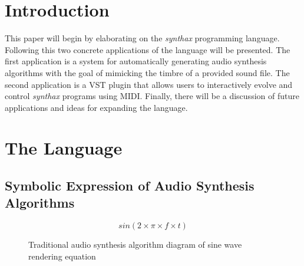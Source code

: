 \documentclass[12pt]{article}
\newcommand{\audiolanguagenamelower}{\emph{synthax}}
\begin{document}
\maketitle

\begin{abstract}
This paper presents an alternative method of digital audio synthesis using Lisp-like symbolic expressions (S-expressions). The method centers around a novel audio programming language called \audiolanguagenamelower{} where valid programs directly represent algorithms for audio synthesis. The motivation for \audiolanguagenamelower's use of S-expressions to generate audio is that they are recursively defined, flexible and convenient from a computational perspective. Additionally, the structures can be created and manipulated through genetic programming allowing users to search for synthesis algorithms that mimic existing instruments or to find entirely new timbres.
\end{abstract}



\section{Introduction}\label{TOPINTRO}
This paper will begin by elaborating on the \audiolanguagenamelower{} programming language. Following this two concrete applications of the language will be presented. The first application is a system for automatically generating audio synthesis algorithms with the goal of mimicking the timbre of a provided sound file. The second application is a VST plugin that allows users to interactively evolve and control \audiolanguagenamelower{} programs using MIDI. Finally, there will be a discussion of future applications and ideas for expanding the language.

\section{The Language}

\subsection{Symbolic Expression of Audio Synthesis Algorithms}\label{SEXPRESSION}

\begin{equation}\label{SINRENDERINFIX}
sin (2 \times \pi \times f \times t)
\end{equation}

\begin{figure}\label{SINRENDERNETWORKFIG}
	\caption{Traditional audio synthesis algorithm diagram of sine wave rendering equation}
	\centering
\end{figure}
\end{document}
